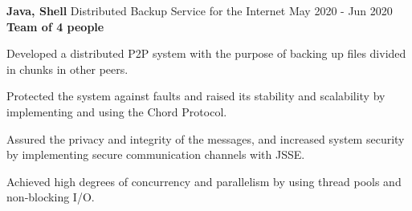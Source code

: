 \cventry
  {\textbf{Java, Shell}} %
  {Distributed Backup Service for the Internet \href{https://github.com/EduRibeiro00/DistBackupService-feup-sdis}{\faExternalLink}} %
  {May 2020 - Jun 2020} %
  {\textbf{Team of 4 people}} %
  {
    \begin{cvitems} %
      \item {Developed a distributed P2P system with the purpose of backing up files divided in chunks in other peers.}
      \item{Protected the system against faults and raised its stability and scalability by implementing and using the Chord Protocol.}
      \item {Assured the privacy and integrity of the messages, and increased system security by implementing secure communication channels with JSSE.}
      \item{Achieved high degrees of concurrency and parallelism by using thread pools and non‐blocking I/O.}
    \end{cvitems}
  }